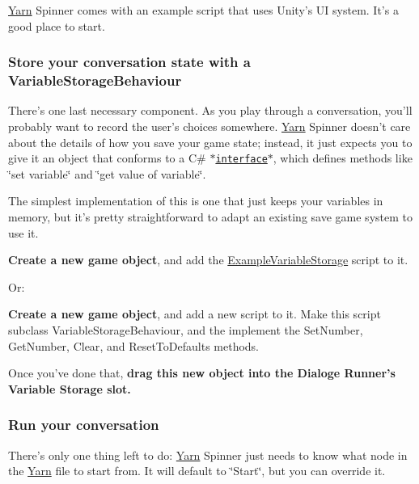 \hyperlink{a00040}{Yarn} Spinner comes with an example script that uses Unity's U\-I system. It's a good place to start.

\subsubsection*{Store your conversation state with a {\ttfamily Variable\-Storage\-Behaviour}}

There's one last necessary component. As you play through a conversation, you'll probably want to record the user's choices somewhere. \hyperlink{a00040}{Yarn} Spinner doesn't care about the details of how you save your game state; instead, it just expects you to give it an object that conforms to a C\# $\ast$\href{C# interface}{\tt interface}$\ast$, which defines methods like \char`\"{}set variable\char`\"{} and \char`\"{}get value of variable\char`\"{}.

The simplest implementation of this is one that just keeps your variables in memory, but it's pretty straightforward to adapt an existing save game system to use it.


\begin{DoxyItemize}
\item {\bfseries Create a new game object}, and add the {\ttfamily \hyperlink{a00047}{Example\-Variable\-Storage}} script to it.
\end{DoxyItemize}

Or\-:


\begin{DoxyItemize}
\item {\bfseries Create a new game object}, and add a new script to it. Make this script subclass {\ttfamily Variable\-Storage\-Behaviour}, and the implement the {\ttfamily Set\-Number}, {\ttfamily Get\-Number}, {\ttfamily Clear}, and {\ttfamily Reset\-To\-Defaults} methods.
\item Once you've done that, {\bfseries drag this new object into the Dialoge Runner's {\ttfamily Variable Storage} slot.}
\end{DoxyItemize}

\subsubsection*{Run your conversation}

There's only one thing left to do\-: \hyperlink{a00040}{Yarn} Spinner just needs to know what node in the \hyperlink{a00040}{Yarn} file to start from. It will default to \char`\"{}\-Start\char`\"{}, but you can override it.


